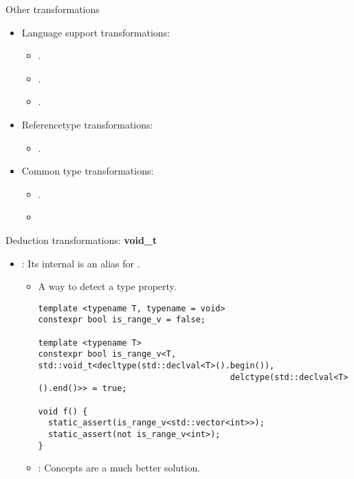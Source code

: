 \begin{frame}[t,fragile]{Other transformations}
\begin{itemize}
  \item Language support transformations:
    \begin{itemize}
      \item {}.
      \item {}.
      \item {}.
    \end{itemize}
  \item Referencetype transformations:
    \begin{itemize}
      \item {}.
    \end{itemize}
  \item Common type transformations:
    \begin{itemize}
      \item {}.
      \item {}
    \end{itemize}
\end{itemize}
\end{frame}

\begin{frame}[t,fragile]{Deduction transformations: \textbf{void\_t}}
\begin{itemize}
  \item {}: Its internal  is an alias for .
    \begin{itemize}
      \item A way to detect a type property.
\begin{lstlisting}
template <typename T, typename = void> 
constexpr bool is_range_v = false;

template <typename T>
constexpr bool is_range_v<T, std::void_t<decltype(std::declval<T>().begin()),
                                       delctype(std::declval<T>().end()>> = true;

void f() {
  static_assert(is_range_v<std::vector<int>>);
  static_assert(not is_range_v<int>); 
}
\end{lstlisting}

      \item {}: Concepts are a much better solution.
    \end{itemize}
\end{itemize}
\end{frame}

